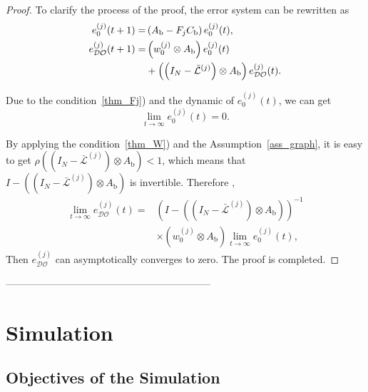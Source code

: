 \documentclass[letterpaper, 10pt, conference]{ieeeconf}  %
\def\L{\mathcal{L}} %
\def\DO{\mathcal{DO}} %
\begin{document}
\begin{proof}
To clarify the process of the proof, the error system can be rewritten as 
\begin{subequations}
    \begin{align}
        e_0^{(j)}(t+1) =& \left( A_{\text{b}} - F_{j} C_{\text{b}}  \right) e_0^{(j)}(t), \label{eq_e0}\\
        e_{\DO}^{(j)}(t+1) =& \left( w_{0}^{(j)} \otimes A_{\text{b}} \right) e_0^{(j)}(t) \notag \\
        &+ \left( \left( I_{N} - \bar{\L}^{(j)}  \right)  \otimes  A_{\text{b}} \right) e_{\DO}^{(j)}(t).
    \end{align}
 \end{subequations}
 
Due to the condition~\ref{thm_Fj}) and the dynamic of $e_0^{(j)}(t)$, we can get
\begin{equation}
    \lim_{t\to \infty} e_0^{(j)}(t) = 0.
\end{equation}

By applying the condition~\ref{thm_W}) and the Assumption~\ref{ass_graph}, it is easy to get $\rho \left( \left( I_{N} - \bar{\L}^{(j)} \right)  \otimes  A_{\text{b}} \right) < 1$, which means that
$I - \left( \left( I_{N} - \bar{\L}^{(j)}  \right)  \otimes  A_{\text{b}} \right)$ is invertible. Therefore \cite{bullo2018lectures,Plug_play},
\begin{equation}
\begin{aligned}
    \lim_{t\to \infty} e_{\DO}^{(j)}(t) =& \left(I - \left( \left( I_{N} - \bar{\L}^{(j)}  \right)  \otimes  A_{\text{b}} \right) \right)^{-1} \\
    & \times \left( w_{0}^{(j)} \otimes A_{\text{b}} \right) \lim_{t\to \infty} e_0^{(j)}(t),
\end{aligned}
\end{equation}
Then $e_{\DO}^{(j)}$ can asymptotically converges to zero. The proof is completed. 
\end{proof}


--------------------------------------------------------------

\section{Simulation}\label{sec_simulation}

\subsection{ Objectives of the Simulation}
\end{document}
